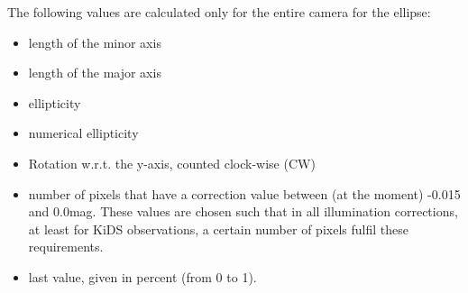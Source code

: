 The following values are calculated only for the entire camera for the ellipse:
\begin{itemize}
\item length of the minor axis
\item length of the major axis
\item ellipticity
\item numerical ellipticity
\item Rotation w.r.t. the y-axis, counted clock-wise (CW)
\item number of pixels that have a correction value between (at the moment) -0.015 and 0.0mag. These values are chosen such that in all illumination corrections, at least for KiDS observations, a certain number of pixels fulfil these requirements.
\item last value, given in percent (from 0 to 1).
\end{itemize}
